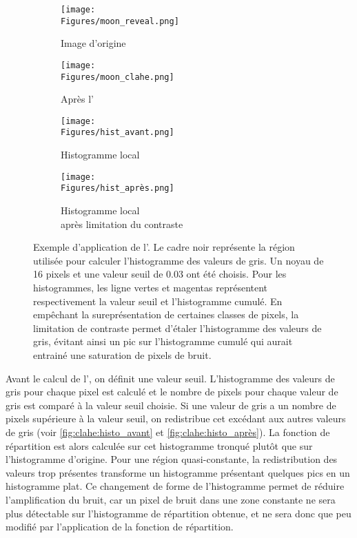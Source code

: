 \documentclass[\main/main.tex]{subfiles}
\begin{document}
\begin{figure}[h!]
    \centering
    \begin{subfigure}[b]{0.45\textwidth}
       \caption{
        \label{fig:clahe:image_avant}
       Image d'origine
            }
       \centering \texttt{[image: \\Figures/moon\_reveal.png]}
    \end{subfigure}
    \begin{subfigure}[b]{0.45\textwidth}
       \caption{
        \label{fig:clahe:image_après}
       Après l'\clahe
            }
       \centering \texttt{[image: \\Figures/moon\_clahe.png]}
    \end{subfigure}
    \begin{subfigure}[b]{0.45\textwidth}
       \caption{
        \label{fig:clahe:histo_avant}
       Histogramme local
            }
       \centering \texttt{[image: \\Figures/hist\_avant.png]}
    \end{subfigure}
    \begin{subfigure}[b]{0.45\textwidth}
       \caption{
        \label{fig:clahe:histo_après}
       \centering
       Histogramme local \\après limitation du contraste
            }
       \centering \texttt{[image: \\Figures/hist\_après.png]}
    \end{subfigure}
    \caption{
        Exemple d'application de l'\clahe{}.\newline
        Le cadre noir représente la région utilisée pour calculer l'histogramme des valeurs de gris.
        Un noyau de 16 pixels et une valeur seuil de 0.03 ont été choisis.
        Pour les histogrammes, les ligne vertes et magentas représentent respectivement la valeur seuil et l'histogramme cumulé.
        En empêchant la sureprésentation de certaines classes de pixels, la limitation de contraste permet d'étaler l'histogramme des valeurs de gris, évitant ainsi un pic sur l'histogramme cumulé qui aurait entrainé une saturation de pixels de bruit.
    }
\end{figure}

%
Avant le calcul de l'\clahe{}, on définit une valeur seuil. L'histogramme des valeurs de gris pour chaque pixel est calculé et le nombre de pixels pour chaque valeur de gris est comparé à la valeur seuil choisie. Si une valeur de gris a un nombre de pixels supérieure à la valeur seuil, on redistribue cet excédant aux autres valeurs de gris (voir \autoref{fig:clahe:histo_avant} et \autoref{fig:clahe:histo_après}). La fonction de répartition est alors calculée sur cet histogramme tronqué plutôt que sur l'histogramme d'origine.
%
Pour une région quasi-constante, la redistribution des valeurs trop présentes transforme un histogramme présentant quelques pics en un histogramme plat. Ce changement de forme de l'histogramme permet de réduire l'amplification du bruit, car un pixel de bruit dans une zone constante ne sera plus détectable sur l'histogramme de répartition obtenue, et ne sera donc que peu modifié par l'application de la fonction de répartition.
\end{document}
